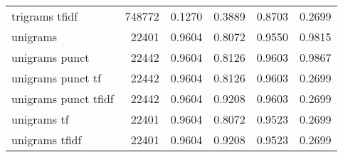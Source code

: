 \documentclass{article}
\begin{document}
\begin{table}
\begin{tabular}{lrrrrr}
trigrams tfidf             &  748772 & 0.1270 &       0.3889 &         0.8703 &               0.2699 \\
unigrams                   &   22401 & 0.9604 &       0.8072 &         0.9550 &               0.9815 \\
unigrams punct             &   22442 & 0.9604 &       0.8126 &         0.9603 &               0.9867 \\
unigrams punct tf          &   22442 & 0.9604 &       0.8126 &         0.9603 &               0.2699 \\
unigrams punct tfidf       &   22442 & 0.9604 &       0.9208 &         0.9603 &               0.2699 \\
unigrams tf                &   22401 & 0.9604 &       0.8072 &         0.9523 &               0.2699 \\
unigrams tfidf             &   22401 & 0.9604 &       0.9208 &         0.9523 &               0.2699 \\
\bottomrule
\end{tabular}

\end{table}
\end{document}
